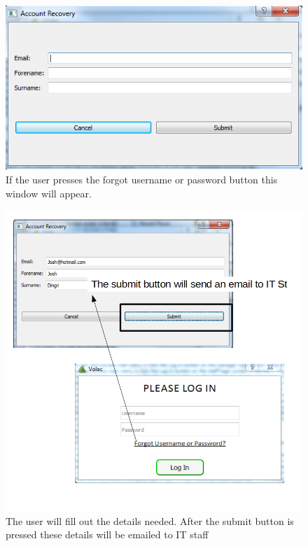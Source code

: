 \begin{figure}[H]
    \includegraphics[width=\textwidth]{./Testing/Images/ForgotPassword.png}
    \caption{If the user presses the forgot username or password button this window will appear.} \label{fig:ForgotPassword}
\end{figure}

\begin{figure}[H]
    \includegraphics[width=\textwidth]{./Testing/Images/SubmitPassword.png}
    \caption{The user will fill out the details needed. After the submit button is pressed these details will be emailed to IT staff} \label{fig:SubmitPassword}
\end{figure}

